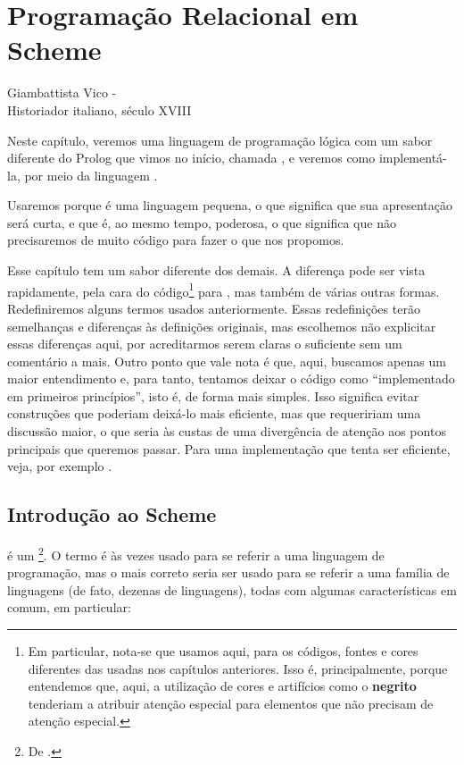 \documentclass{article}
\begin{document}
\section{Programação Relacional em Scheme}

\epigraph{}{Giambattista Vico - \\Historiador italiano, século XVIII}


Neste capítulo, veremos uma linguagem de programação lógica com um
sabor diferente do Prolog que vimos no início, chamada
, e veremos como implementá-la, por meio da
linguagem .

Usaremos  porque é uma linguagem pequena, o
que significa que sua apresentação será curta, e que é, ao mesmo
tempo, poderosa, o que significa que não precisaremos de muito código
para fazer o que nos propomos.

Esse capítulo tem um sabor diferente dos demais. A diferença pode ser vista
rapidamente, pela cara do código\footnote{Em particular, nota-se que
  usamos aqui, para os códigos, fontes e cores diferentes das usadas nos
  capítulos anteriores. Isso é, principalmente, porque entendemos que, aqui, a
  utilização de cores e artifícios como o {\bf negrito} tenderiam a
  atribuir atenção especial para elementos que não precisam de atenção
  especial.} para , mas também de várias outras
formas. Redefiniremos alguns termos usados anteriormente. Essas
redefinições terão semelhanças e diferenças às definições originais,
mas escolhemos não explicitar essas diferenças aqui, por acreditarmos serem
claras o suficiente sem um comentário a mais. Outro ponto que vale nota é que, aqui, buscamos
apenas um maior entendimento e, para tanto, tentamos deixar o código
como ``implementado em primeiros princípios'', isto é, de forma mais
simples. Isso significa evitar construções que poderiam
deixá-lo mais eficiente, mas que requeririam uma discussão maior,
o que seria às custas de uma divergência de atenção aos pontos
principais que queremos passar. Para uma implementação que tenta ser
eficiente, veja, por exemplo \cite{fast}.

\subsection{Introdução ao Scheme}

 é um \footnote{De
  .}. O termo  é às vezes
usado para se referir a uma linguagem de programação, mas o mais
correto seria ser usado para se referir a uma família de linguagens (de fato,
dezenas de linguagens), todas com algumas características em comum,
em particular:
\end{document}
